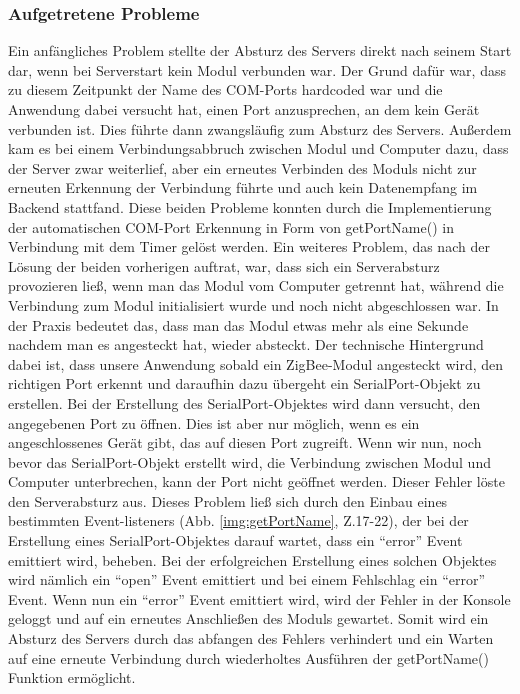 \documentclass[]{article}
\begin{document}
			\subsubsection{Aufgetretene Probleme}
			Ein anfängliches Problem stellte der Absturz des Servers direkt nach seinem Start dar, wenn bei Serverstart kein Modul verbunden war. Der Grund dafür war, dass zu diesem Zeitpunkt der Name des COM-Ports hardcoded war und die Anwendung dabei versucht hat, einen Port anzusprechen, an dem kein Gerät verbunden ist. Dies führte dann zwangsläufig zum Absturz des Servers. Außerdem kam es bei einem Verbindungsabbruch zwischen Modul und Computer dazu, dass der Server zwar weiterlief, aber ein erneutes Verbinden des Moduls nicht zur erneuten Erkennung der Verbindung führte und auch kein Datenempfang im Backend stattfand.\newline
Diese beiden Probleme konnten durch die Implementierung der automatischen COM-Port Erkennung in Form von getPortName() in Verbindung mit dem Timer gelöst werden.\newline
Ein weiteres Problem, das nach der Lösung der beiden vorherigen auftrat, war, dass sich ein Serverabsturz provozieren ließ, wenn man das Modul vom Computer getrennt hat, während die Verbindung zum Modul initialisiert wurde und noch nicht abgeschlossen war. In der Praxis bedeutet das, dass man das Modul etwas mehr als eine Sekunde nachdem man es angesteckt hat, wieder absteckt. Der technische Hintergrund dabei ist, dass unsere Anwendung sobald ein ZigBee-Modul angesteckt wird, den richtigen Port erkennt und daraufhin dazu übergeht ein SerialPort-Objekt zu erstellen. Bei der Erstellung des SerialPort-Objektes wird dann versucht, den angegebenen Port zu öffnen. Dies ist aber nur möglich, wenn es ein angeschlossenes Gerät gibt, das auf diesen Port zugreift. Wenn wir nun, noch bevor das SerialPort-Objekt erstellt wird, die Verbindung zwischen Modul und Computer unterbrechen, kann der Port nicht geöffnet werden. Dieser Fehler löste den Serverabsturz aus.\newline  
Dieses Problem ließ sich durch den Einbau eines bestimmten Event-listeners (Abb. \ref{img:getPortName}, Z.17-22), der bei der Erstellung eines SerialPort-Objektes darauf wartet, dass ein “error” Event emittiert wird, beheben. Bei der erfolgreichen Erstellung eines solchen Objektes wird nämlich ein “open” Event emittiert und bei einem Fehlschlag ein “error” Event. Wenn nun ein “error” Event emittiert wird, wird der Fehler in der Konsole geloggt und auf ein erneutes Anschließen des Moduls gewartet. Somit wird ein Absturz des Servers durch das abfangen des Fehlers verhindert und ein Warten auf eine erneute Verbindung durch wiederholtes Ausführen der getPortName() Funktion ermöglicht.
\end{document}
